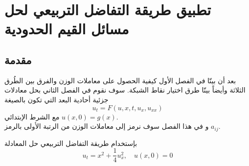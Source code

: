 \chapter{تطبيق طريقة التفاضل التربيعي لحل مسائل القيم الحدودية}

\section[مقدمة]{مقدمة }
بعد أن بينّا في الفصل الأول كيفية الحصول على معاملات الوزن والفرق بين الطُرق الثلاثة وأيضاً بينّا طرق اختيار نقاط الشبكة. سوف نقوم في الفصل الثاني بحل معادلات جزئية أحادية البعد التي تكون بالصيغة 
\begin{equation}\label{eq:one_dim_diff_eq}
	u_t=F(u,x,t,u_x,u_{xx})
\end{equation}
مع الشرط الإبتدائي $u(x,0)=g(x)$.\\
\noindent
و في هذا الفصل سوف نرمز إلى معاملات الوزن من الرتبة الأولى بالرمز $a_{ij}$.

\begin{example}
	بإستخدام طريقة التفاضل التربيعي حل المعادلة 
\begin{equation}
	\label{eq:firstexample}
	u_t = x^2 + \frac{1}{4} u_x^2, \quad u(x, 0) = 0
\end{equation}
\end{example}

